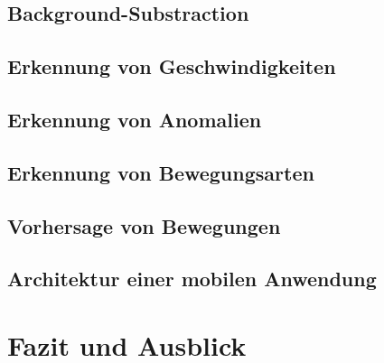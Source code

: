 \documentclass{hsflensburg}
\begin{document}
  \section{Background-Substraction}
  \section{Erkennung von Geschwindigkeiten}
  \section{Erkennung von Anomalien}
  \section{Erkennung von Bewegungsarten}
  \section{Vorhersage von Bewegungen}
  \section{Architektur einer mobilen Anwendung}

  \chapter{Fazit und Ausblick}

  \printbibliography
\end{document}
